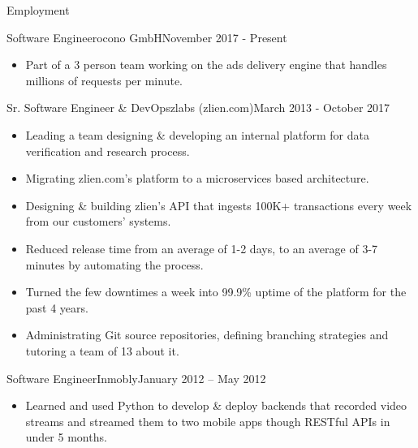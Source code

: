\documentclass[]{mosabcv}
\begin{document}
    \makeheader

    \begin{cvsection}{Employment}
        \begin{cvsubsection}{Software Engineer}{ocono GmbH}{November 2017 - Present}
            \begin{itemize}
                \item Part of a 3 person team working on the ads delivery engine that handles millions of requests per minute.
            \end {itemize}

        \end{cvsubsection}
        \begin{cvsubsection}{Sr. Software Engineer \& DevOps}{zlabs (zlien.com)}{March 2013 - October 2017}
            \begin{itemize}
                \item Leading a team designing \& developing an internal platform for data verification and research process.
                \item Migrating zlien.com's platform to a microservices based architecture.
                \item Designing \& building zlien's API that ingests 100K+ transactions every week from our customers' systems.
                \item Reduced release time from an average of 1-2 days, to an average of 3-7 minutes by automating the process.
                \item Turned the few downtimes a week into 99.9\% uptime of the platform for the past 4 years.
                \item Administrating Git source repositories, defining branching strategies and tutoring a team of 13 about it.
            \end{itemize}
        \end{cvsubsection}

        \begin{cvsubsection}{Software Engineer}{Inmobly}{January 2012 – May 2012}
            \begin{itemize}
                \item Learned and used Python to develop \& deploy backends that recorded video streams and streamed them to two mobile apps though RESTful APIs in under 5 months.
            \end{itemize}
        \end{cvsubsection}


\end{cvsection}
\end{document}
